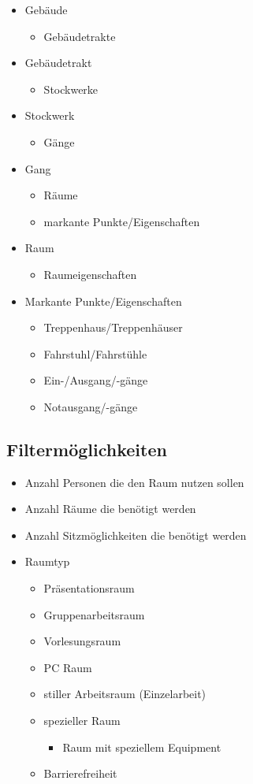 \begin{itemize}
	\item Gebäude
	\begin{itemize}
		\item Gebäudetrakte
	\end{itemize}
	\item Gebäudetrakt
	\begin{itemize}
		\item Stockwerke
	\end{itemize}
	\item Stockwerk
	\begin{itemize}
		\item Gänge
	\end{itemize}
	\item Gang
	\begin{itemize}
		\item Räume
		\item markante Punkte/Eigenschaften
	\end{itemize}
	\item Raum
	\begin{itemize}
		\item Raumeigenschaften
	\end{itemize}
	\item Markante Punkte/Eigenschaften
	\begin{itemize}
		\item Treppenhaus/Treppenhäuser
		\item Fahrstuhl/Fahrstühle
		\item Ein-/Ausgang/-gänge
		\item Notausgang/-gänge
	\end{itemize}
\end{itemize}

\subsection{Filtermöglichkeiten}
\label{sec:Filtermöglichkeiten}

\begin{itemize}
	\item Anzahl Personen die den Raum nutzen sollen
	\item Anzahl Räume die benötigt werden
	\item Anzahl Sitzmöglichkeiten die benötigt werden
	\item Raumtyp
	\begin{itemize}
		\item Präsentationsraum
		\item Gruppenarbeitsraum
		\item Vorlesungsraum
		\item PC Raum
		\item stiller Arbeitsraum (Einzelarbeit)
		\item spezieller Raum
		\begin{itemize}
			\item Raum mit speziellem Equipment
		\end{itemize}
		\item Barrierefreiheit
	\end{itemize}
\end{itemize}


